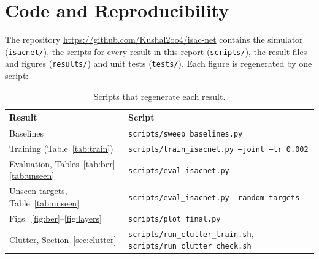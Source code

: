 \documentclass[11pt,a4paper]{article}
\begin{document}
\appendix
\section{Code and Reproducibility}
{\sloppy The repository \url{https://github.com/Kushal2oo4/isac-net} contains the simulator (\texttt{isacnet/}), the scripts for every result in this report (\texttt{scripts/}), the result files and figures (\texttt{results/}) and unit tests (\texttt{tests/}). Each figure is regenerated by one script:\par}

\begin{table}[H]
\centering\small
\begin{tabular}{ll}
\toprule
Result & Script \\
\midrule
Baselines & \texttt{scripts/sweep\_baselines.py} \\
Training (Table~\ref{tab:train}) & \texttt{scripts/train\_isacnet.py --joint --lr 0.002} \\
Evaluation, Tables~\ref{tab:ber}--\ref{tab:unseen} & \texttt{scripts/eval\_isacnet.py} \\
Unseen targets, Table~\ref{tab:unseen} & \texttt{scripts/eval\_isacnet.py --random-targets} \\
Figs.~\ref{fig:ber}--\ref{fig:layers} & \texttt{scripts/plot\_final.py} \\
Clutter, Section~\ref{sec:clutter} & \texttt{scripts/run\_clutter\_train.sh}, \texttt{scripts/run\_clutter\_check.sh} \\
\bottomrule
\end{tabular}
\caption{Scripts that regenerate each result.}
\end{table}
\end{document}
